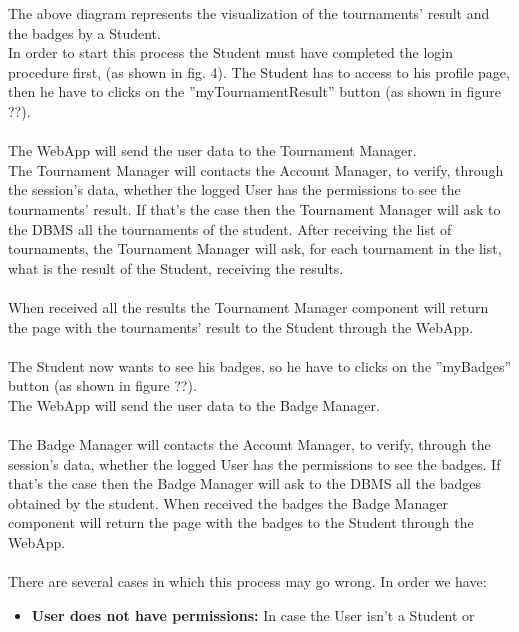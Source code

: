 \documentclass{article}
\begin{document}
{        The above diagram represents the visualization of the tournaments'
        result and the badges by a Student. \\
        In order to start this process the Student must have 
        completed the login procedure first, (as shown in fig. 4).
        The Student has to access to his profile page, then he have to
        clicks on the ”myTournamentResult” button (as shown in figure ??).
        \\ \\
        The WebApp will send the user data to the Tournament Manager.\\
        The Tournament Manager will contacts the Account Manager, to verify, 
        through the session’s data, whether the logged User has the 
        permissions to see the tournaments' result. If that’s the case then 
        the Tournament Manager will ask to the DBMS all the tournaments
        of the student. After receiving the list of tournaments, the Tournament
        Manager will ask, for each tournament in the list, what is the result
        of the Student, receiving the results.
        \\ \\
        When received all the results the Tournament Manager component will 
        return the page with the tournaments' result to the Student through 
        the WebApp.
        \\ \\
        The Student now wants to see his badges, so he have to
        clicks on the ”myBadges” button (as shown in figure ??).\\
        The WebApp will send the user data to the Badge Manager.
        \\ \\
        The Badge Manager will contacts the Account Manager, to verify, 
        through the session’s data, whether the logged User has the 
        permissions to see the badges. If that’s the case then 
        the Badge Manager will ask to the DBMS all the badges obtained by
        the student. When received the badges the Badge Manager component will 
        return the page with the badges to the Student through the WebApp. 
        \\ \\
        There are several cases in which this process may go wrong. In order we have:
        \begin{itemize}
            \item \textbf{User does not have permissions:} In case the User isn't a Student or

\end{itemize}}
\end{document}
